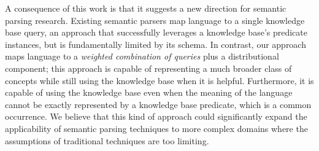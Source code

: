 \documentclass[11pt]{article}
\begin{document}
A consequence of this work is that it suggests a new direction for
semantic parsing research. Existing semantic parsers map language to a
single knowledge base query, an approach that successfully leverages a
knowledge base's predicate instances, but is fundamentally limited by
its schema. In contrast, our approach maps language to a
\emph{weighted combination of queries} plus a distributional
component; this approach is capable of representing a much broader
class of concepts while still using the knowledge base when it is
helpful. Furthermore, it is capable of using the knowledge base even
when the meaning of the language cannot be exactly represented by a
knowledge base predicate, which is a common occurrence. We believe
that this kind of approach could significantly expand the
applicability of semantic parsing techniques to more complex domains
where the assumptions of traditional techniques are too limiting.




\end{document}
